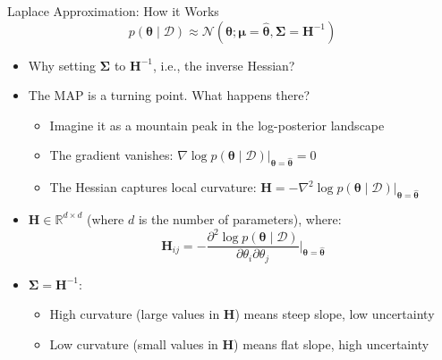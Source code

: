 \documentclass{beamer}
\begin{document}
\begin{frame}{Laplace Approximation: How it Works}
  \[p(\boldsymbol{\theta} \mid \mathcal{D}) \approx \mathcal{N}(\bm{\theta}; \bm{\mu} = \hat{\boldsymbol{\theta}}, \bm{\Sigma}=\mathbf{H}^{-1})\]
  \begin{itemize}
  \item Why setting \(\bm{\Sigma}\) to \(\mathbf{H}^{-1}\), i.e., the inverse Hessian?
  \item The MAP is a turning point. What happens there?
    \begin{itemize}
    \item Imagine it as a mountain peak in the log-posterior landscape
    \item The gradient vanishes:
      \(\nabla \log p(\boldsymbol{\theta} \mid \mathcal{D})\big|_{\boldsymbol{\theta} = \hat{\boldsymbol{\theta}}} = 0\
      \)
    \item The Hessian captures local curvature:
      \(\mathbf{H} = -\nabla^2 \log p(\boldsymbol{\theta} \mid \mathcal{D})\big|_{\boldsymbol{\theta} = \hat{\boldsymbol{\theta}}}\)
    \end{itemize}
  \item \(\mathbf{H} \in \mathbb{R}^{d \times d}\) (where \(d\) is the number of parameters), where:
    \[\mathbf{H}_{ij} = -\frac{\partial^2 \log p(\boldsymbol{\theta} \mid \mathcal{D})}{\partial \theta_i \partial \theta_j}\bigg|_{\boldsymbol{\theta} = \hat{\boldsymbol{\theta}}}\]
    \item \(\bm{\Sigma} = \mathbf{H}^{-1}\):
    \begin{itemize}
  \item High curvature (large values in \(\mathbf{H}\)) means steep slope, low uncertainty
  \item Low curvature (small values in \(\mathbf{H}\)) means flat slope, high uncertainty
    \end{itemize}

    \end{itemize}
\end{frame}
\end{document}
